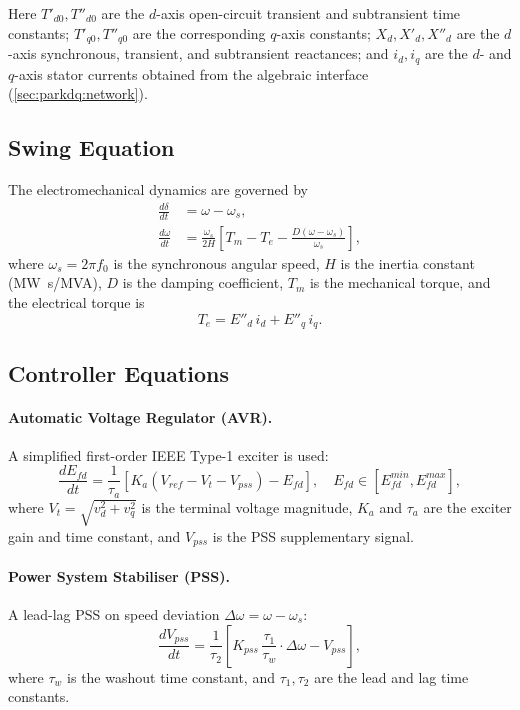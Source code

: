 \documentclass[12pt,a4paper]{article}
\theoremstyle{definition}
\theoremstyle{plain}
\begin{document}
Here $T'_{d0}, T''_{d0}$ are the $d$-axis open-circuit transient and
subtransient time constants; $T'_{q0}, T''_{q0}$ are the corresponding
$q$-axis constants; $X_d, X'_d, X''_d$ are the $d$-axis synchronous,
transient, and subtransient reactances; and $i_d, i_q$ are the $d$- and
$q$-axis stator currents obtained from the algebraic interface
(\cref{sec:parkdq:network}).

\subsection{Swing Equation}
\label{sec:parkdq:swing}

The electromechanical dynamics are governed by
\begin{align}
  \frac{d\delta}{dt}  &= \omega - \omega_s,
  \label{eq:parkdq:ddelta}\\[4pt]
  \frac{d\omega}{dt}  &= \frac{\omega_s}{2H}\left[T_m - T_e
                         - \frac{D(\omega - \omega_s)}{\omega_s}\right],
  \label{eq:parkdq:domega}
\end{align}
where $\omega_s = 2\pi f_0$ is the synchronous angular speed, $H$ is the
inertia constant (\si{MW.s/MVA}), $D$ is the damping coefficient, $T_m$ is
the mechanical torque, and the electrical torque is
\begin{equation}
  T_e = E''_d\,i_d + E''_q\,i_q.
  \label{eq:parkdq:Te}
\end{equation}

\subsection{Controller Equations}
\label{sec:parkdq:controllers}

\paragraph{Automatic Voltage Regulator (AVR).}
A simplified first-order IEEE Type-1 exciter \citep{IEEE1110} is used:
\begin{equation}
  \frac{dE_{fd}}{dt} = \frac{1}{\tau_a}\left[K_a(V_{ref} - V_t - V_{pss})
                        - E_{fd}\right],
  \quad E_{fd} \in [E_{fd}^{min}, E_{fd}^{max}],
  \label{eq:parkdq:avr}
\end{equation}
where $V_t = \sqrt{v_d^2 + v_q^2}$ is the terminal voltage magnitude,
$K_a$ and $\tau_a$ are the exciter gain and time constant, and
$V_{pss}$ is the PSS supplementary signal.

\paragraph{Power System Stabiliser (PSS).}
A lead-lag PSS on speed deviation $\Delta\omega = \omega - \omega_s$:
\begin{equation}
  \frac{dV_{pss}}{dt} = \frac{1}{\tau_2}\left[K_{pss}\,\frac{\tau_1}{\tau_w}
                         \cdot \Delta\omega - V_{pss}\right],
  \label{eq:parkdq:pss}
\end{equation}
where $\tau_w$ is the washout time constant, and $\tau_1, \tau_2$ are the
lead and lag time constants.
\end{document}
